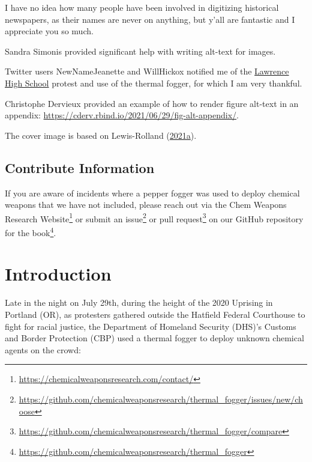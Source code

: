 \documentclass[
  11pt,
]{krantz}
\renewcommand{\href}[2]{#2\footnote{\url{#1}}}
\begin{document}
I have no idea how many people have been involved in digitizing historical newspapers, as their names are never on anything, but y'all are fantastic and I appreciate you so much.

Sandra Simonis provided significant help with writing alt-text for images.

Twitter users NewNameJeanette and WillHickox notified me of the \protect\hyperlink{Lawrence1970_04_21}{Lawrence High School} protest and use of the thermal fogger, for which I am very thankful.

Christophe Dervieux provided an example of how to render figure alt-text in an appendix: \url{https://cderv.rbind.io/2021/06/29/fig-alt-appendix/}.

The cover image is based on Lewis-Rolland (\protect\hyperlink{ref-Lewis-Rolland2021a}{2021a}).

\hypertarget{contribute-information}{%
\section*{Contribute Information}\label{contribute-information}}


If you are aware of incidents where a pepper fogger was used to deploy chemical weapons that we have not included, please reach out \href{https://chemicalweaponsresearch.com/contact/}{via the Chem Weapons Research Website} or submit an \href{https://github.com/chemicalweaponsresearch/thermal_fogger/issues/new/choose}{issue} or \href{https://github.com/chemicalweaponsresearch/thermal_fogger/compare}{pull request} on our \href{https://github.com/chemicalweaponsresearch/thermal_fogger}{GitHub repository for the book}.

\mainmatter

\hypertarget{introduction}{%
\chapter{Introduction}\label{introduction}}

Late in the night on July 29th, during the height of the 2020 Uprising in Portland (OR), as protesters gathered outside the Hatfield Federal Courthouse to fight for racial justice, the Department of Homeland Security (DHS)'s Customs and Border Protection (CBP) used a thermal fogger to deploy unknown chemical agents on the crowd:
\end{document}
